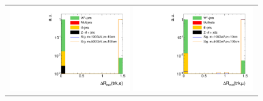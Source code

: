 \begin{figure}[!t]
  \centering 
  \vspace{25pt}
  \begin{tabular}{c}
    \includegraphics[width=0.49\textwidth]{figures/analysis/AnalysisSelection/htrackdRminElec_log.pdf}
    \includegraphics[width=0.49\textwidth]{figures/analysis/AnalysisSelection/htrackdRminMuon_log.pdf}\\


\end{tabular}
\end{figure}
